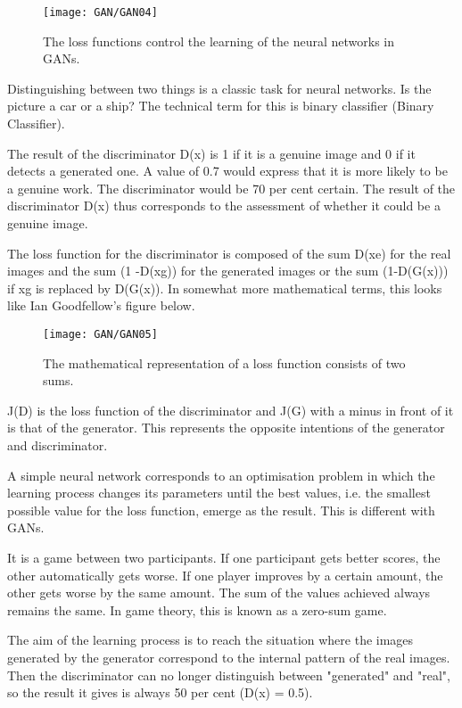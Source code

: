 \begin{figure}
	\texttt{[image: GAN/GAN04]}
	\caption{The loss functions control the learning of the neural networks in GANs.} 
	\label{GAN04}
\end{figure}


Distinguishing between two things is a classic task for neural networks. Is the picture a car or a ship? The technical term for this is binary classifier (Binary Classifier).

The result of the discriminator D(x) is 1 if it is a genuine image and 0 if it detects a generated one. A value of 0.7 would express that it is more likely to be a genuine work. The discriminator would be 70 per cent certain. The result of the discriminator D(x) thus corresponds to the assessment of whether it could be a genuine image.

The loss function for the discriminator is composed of the sum D(xe) for the real images and the sum (1 -D(xg)) for the generated images or the sum (1-D(G(x))) if xg is replaced by D(G(x)). In somewhat more mathematical terms, this looks like Ian Goodfellow's figure below.

\begin{figure}
	\texttt{[image: GAN/GAN05]}
	\caption{The mathematical representation of a loss function consists of two sums.} 
	\label{GAN05}
\end{figure}

J(D) is the loss function of the discriminator and J(G) with a minus in front of it is that of the generator. This represents the opposite intentions of the generator and discriminator.

A simple neural network corresponds to an optimisation problem in which the learning process changes its parameters until the best values, i.e. the smallest possible value for the loss function, emerge as the result. This is different with GANs.

It is a game between two participants. If one participant gets better scores, the other automatically gets worse. If one player improves by a certain amount, the other gets worse by the same amount. The sum of the values achieved always remains the same. In game theory, this is known as a zero-sum game.

The aim of the learning process is to reach the situation where the images generated by the generator correspond to the internal pattern of the real images. Then the discriminator can no longer distinguish between "generated" and "real", so the result it gives is always 50 per cent (D(x) = 0.5).

